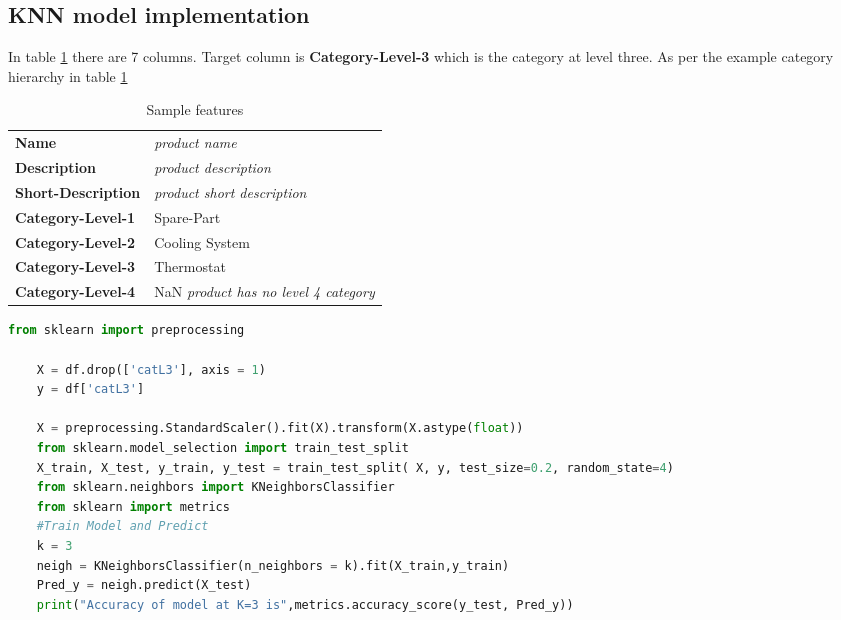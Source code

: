 \subsection{\acs{KNN} model implementation}

In table \ref{table:KNN_implementation} there are 7 columns. Target column is \textbf{Category-Level-3} which is the category at level three.
As per the example category hierarchy in table \ref{table:KNN_implementation} 



\begin{table}[h]
    \centering
    \caption{Sample features }
    \label{table:KNN_implementation}
    \begin{tabular}{ll}
        \toprule     
        \textbf{Name}& \textit{product name} \\
        \textbf{Description}& \textit{product description} \\
        \textbf{Short-Description}& \textit{product short description} \\
        \textbf{Category-Level-1}& Spare-Part \\
        \textbf{Category-Level-2}& Cooling System \\
        \textbf{Category-Level-3}& Thermostat \\
        \textbf{Category-Level-4}& NaN \textit{product has no level 4 category} \\
        \bottomrule
    \end{tabular}

\end{table}

\begin{lstlisting}[language=Python,caption={Finding k-nearest neighbor},label={cd:fkn}]
    from sklearn import preprocessing
   
    X = df.drop(['catL3'], axis = 1)
    y = df['catL3']

    X = preprocessing.StandardScaler().fit(X).transform(X.astype(float))
    from sklearn.model_selection import train_test_split
    X_train, X_test, y_train, y_test = train_test_split( X, y, test_size=0.2, random_state=4)
    from sklearn.neighbors import KNeighborsClassifier
    from sklearn import metrics
    #Train Model and Predict
    k = 3  
    neigh = KNeighborsClassifier(n_neighbors = k).fit(X_train,y_train)
    Pred_y = neigh.predict(X_test)
    print("Accuracy of model at K=3 is",metrics.accuracy_score(y_test, Pred_y))
\end{lstlisting}


